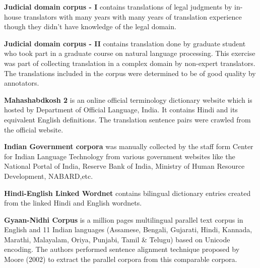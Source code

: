 \textbf{Judicial domain corpus - I} contains translations of legal judgments by in-house translators with many years with many years of translation experience though they didn’t have knowledge of the legal domain.

\textbf{Judicial domain corpus - II} contains translation done by graduate student who took part in a graduate course on natural language processing. This exercise was part of collecting translation in a complex domain by non-expert translators. The translations included in the corpus were determined to be of good quality by annotators.

\textbf{Mahashabdkosh 2} is an online official terminology dictionary website which is hosted by Department of Official Language, India. It contains Hindi and its equivalent English definitions. The translation sentence pairs were crawled from the official website.

\textbf{Indian Government corpora} was manually collected by the staff form Center for Indian Language Technology from various government websites like the National Portal of India, Reserve Bank of India, Ministry of Human Resource Development, NABARD,etc.

\textbf{Hindi-English Linked Wordnet} contains bilingual dictionary entries created from the linked Hindi and English wordnets.

\textbf{Gyaan-Nidhi Corpus} is a million pages multilingual parallel text corpus in English and 11 Indian languages (Assamese, Bengali, Gujarati, Hindi, Kannada, Marathi, Malayalam, Oriya, Punjabi, Tamil \& Telugu) based on Unicode encoding. The authors performed sentence alignment technique proposed by Moore (2002) to extract the parallel corpora from this comparable corpora. 

